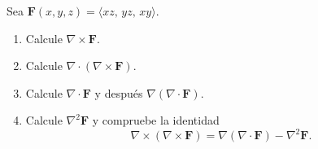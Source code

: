 Sea $\mathbf{F}(x,y,z)=\langle xz,\,yz,\,xy\rangle$.
\begin{enumerate}
    \item Calcule $\nabla\times\mathbf{F}$.
    \item Calcule $\nabla\cdot(\nabla\times\mathbf{F})$.
    \item Calcule $\nabla\cdot\mathbf{F}$ y después $\nabla(\nabla\cdot\mathbf{F})$.
    \item Calcule $\nabla^2\mathbf{F}$ y compruebe la identidad
    \[
    \nabla\times(\nabla\times\mathbf{F})
    =\nabla(\nabla\cdot\mathbf{F})-\nabla^2\mathbf{F}.
    \]
\end{enumerate}

